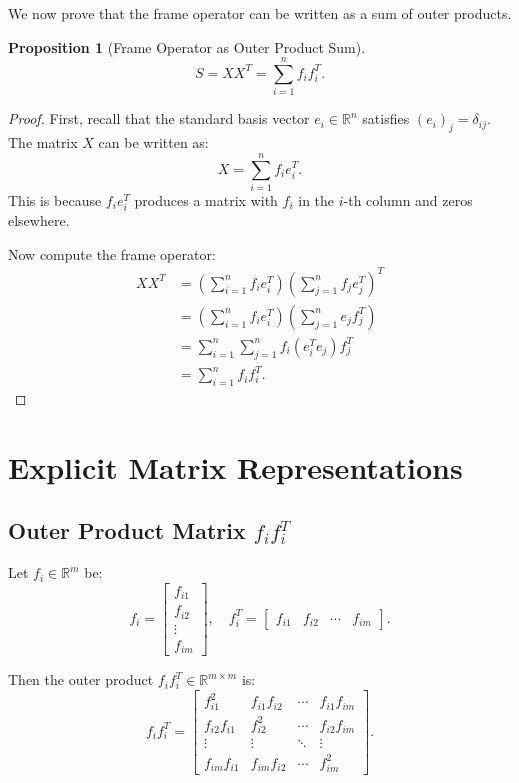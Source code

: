 \documentclass[12pt]{article}
\newtheorem{proposition}{Proposition}
\begin{document}
We now prove that the frame operator can be written as a sum of outer products.

\begin{proposition}[Frame Operator as Outer Product Sum]
\[
S = XX^T = \sum_{i=1}^n f_i f_i^T.
\]
\end{proposition}

\begin{proof}
First, recall that the standard basis vector $e_i \in \mathbb{R}^n$ satisfies $(e_i)_j = \delta_{ij}$. The matrix $X$ can be written as:
\[
X = \sum_{i=1}^n f_i e_i^T.
\]
This is because $f_i e_i^T$ produces a matrix with $f_i$ in the $i$-th column and zeros elsewhere.

Now compute the frame operator:
\begin{align*}
XX^T &= \left( \sum_{i=1}^n f_i e_i^T \right) \left( \sum_{j=1}^n f_j e_j^T \right)^T \\
&= \left( \sum_{i=1}^n f_i e_i^T \right) \left( \sum_{j=1}^n e_j f_j^T \right) \\
&= \sum_{i=1}^n \sum_{j=1}^n f_i (e_i^T e_j) f_j^T \\
&= \sum_{i=1}^n f_i f_i^T.
\end{align*}
\end{proof}

\section{Explicit Matrix Representations}

\subsection{Outer Product Matrix \( f_i f_i^T \)}

Let \( f_i \in \mathbb{R}^m \) be:
\[
f_i = \begin{bmatrix} f_{i1} \\ f_{i2} \\ \vdots \\ f_{im} \end{bmatrix},
\quad
f_i^T = \begin{bmatrix} f_{i1} & f_{i2} & \cdots & f_{im} \end{bmatrix}.
\]

Then the outer product \( f_i f_i^T \in \mathbb{R}^{m \times m} \) is:
\[
f_i f_i^T =
\begin{bmatrix}
f_{i1}^2 & f_{i1}f_{i2} & \cdots & f_{i1}f_{im} \\
f_{i2}f_{i1} & f_{i2}^2 & \cdots & f_{i2}f_{im} \\
\vdots & \vdots & \ddots & \vdots \\
f_{im}f_{i1} & f_{im}f_{i2} & \cdots & f_{im}^2
\end{bmatrix}.
\]
\end{document}
